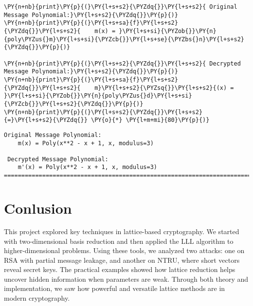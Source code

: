 \documentclass[a4paper,12pt]{article}
\begin{document}
\begin{tcolorbox}[breakable, size=fbox, boxrule=1pt, pad at break*=1mm,colback=cellbackground, colframe=cellborder]
\begin{Verbatim}[commandchars=\\\{\}]
\PY{n+nb}{print}\PY{p}{(}\PY{l+s+s2}{\PYZdq{}}\PY{l+s+s2}{ Original Message Polynomial:}\PY{l+s+s2}{\PYZdq{}}\PY{p}{)}
\PY{n+nb}{print}\PY{p}{(}\PY{l+s+sa}{f}\PY{l+s+s2}{\PYZdq{}}\PY{l+s+s2}{    m(x) = }\PY{l+s+si}{\PYZob{}}\PY{n}{poly\PYZus{}m}\PY{l+s+si}{\PYZcb{}}\PY{l+s+se}{\PYZbs{}n}\PY{l+s+s2}{\PYZdq{}}\PY{p}{)}

\PY{n+nb}{print}\PY{p}{(}\PY{l+s+s2}{\PYZdq{}}\PY{l+s+s2}{ Decrypted Message Polynomial:}\PY{l+s+s2}{\PYZdq{}}\PY{p}{)}
\PY{n+nb}{print}\PY{p}{(}\PY{l+s+sa}{f}\PY{l+s+s2}{\PYZdq{}}\PY{l+s+s2}{    m}\PY{l+s+s2}{\PYZsq{}}\PY{l+s+s2}{(x) = }\PY{l+s+si}{\PYZob{}}\PY{n}{poly\PYZus{}d}\PY{l+s+si}{\PYZcb{}}\PY{l+s+s2}{\PYZdq{}}\PY{p}{)}
\PY{n+nb}{print}\PY{p}{(}\PY{l+s+s2}{\PYZdq{}}\PY{l+s+s2}{=}\PY{l+s+s2}{\PYZdq{}} \PY{o}{*} \PY{l+m+mi}{80}\PY{p}{)}
\end{Verbatim}
\end{tcolorbox}

    \begin{Verbatim}[commandchars=\\\{\}]
 Original Message Polynomial:
    m(x) = Poly(x**2 - x + 1, x, modulus=3)

 Decrypted Message Polynomial:
    m'(x) = Poly(x**2 - x + 1, x, modulus=3)
========================================================================
    \end{Verbatim}





\newpage
\section{Conlusion}

This project explored key techniques in lattice-based cryptography. We started with two-dimensional basis reduction and then applied the LLL algorithm to higher-dimensional problems. Using these tools, we analyzed two attacks: one on RSA with partial message leakage, and another on NTRU, where short vectors reveal secret keys. The practical examples showed how lattice reduction helps uncover hidden information when parameters are weak. Through both theory and implementation, we saw how powerful and versatile lattice methods are in modern cryptography.


\end{document}
